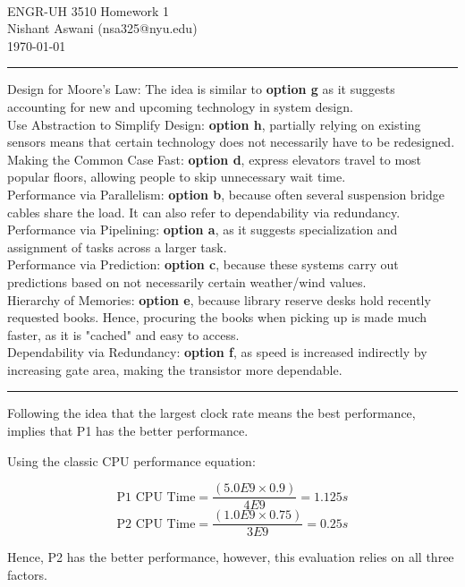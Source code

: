 \documentclass[11pt]{exam}
\makeatletter
\newcommand{\myname}{Nishant Aswani}
\newcommand{\myemail}{nsa325@nyu.edu}
\newcommand{\myhwtype}{Homework}
\newcommand{\myhwnum}{1}
\newcommand{\mycoursenumber}{ENGR-UH 3510}
\newcounter{questionCounter}
\newcounter{partCounter}[questionCounter]
\newenvironment{namedquestion}[1]{%
    \addtocounter{questionCounter}{1}%
    \setcounter{partCounter}{0}%
    \vspace{.2in}%
        \noindent{\bf #1}%
    \vspace{0.3em} \hrule \vspace{.1in}%
}{}
\makeatother
\begin{document}
\

{\newpage}


\thispagestyle{plain}
\begin{center}
  {\Large \mycoursenumber{} \myhwtype{} \myhwnum} \\
  \myname{} (\myemail{}) \\
  \today
\end{center}

\setcounter{questionCounter}{0}

\begin{namedquestion}{Question 1.2}
Design for Moore's Law: The idea is similar to \textbf{option g} as it suggests accounting for new and upcoming technology in system design. \\

Use Abstraction to Simplify Design: \textbf{option h}, partially relying on existing sensors means that certain technology does not necessarily have to be redesigned. \\

Making the Common Case Fast: \textbf{option d}, express elevators travel to most popular floors, allowing people to skip unnecessary wait time. \\

Performance via Parallelism: \textbf{option b}, because often several suspension bridge cables share the load. It can also refer to dependability via redundancy. \\

Performance via Pipelining: \textbf{option a}, as it suggests specialization and assignment of tasks across a larger task. \\

Performance via Prediction: \textbf{option c}, because these systems carry out predictions based on not necessarily certain weather/wind values. \\

Hierarchy of Memories: \textbf{option e}, because library reserve desks hold recently requested books. Hence, procuring the books when picking up is made much faster, as it is "cached" and easy to access.\\

Dependability via Redundancy: \textbf{option f}, as speed is increased indirectly by increasing gate area, making the transistor more dependable. 

\end{namedquestion}

\begin{namedquestion}{Question 1.12.1}
Following the idea that the largest clock rate means the best performance, implies that P1 has the better performance. 

Using the classic CPU performance equation:

 \[\text{P1 CPU Time} = \frac{(5.0E9 \times 0.9)}{4E9} = 1.125s\]
 \[\text{P2 CPU Time} = \frac{(1.0E9 \times 0.75)}{3E9} = 0.25s\]
 
Hence, P2 has the better performance, however, this evaluation relies on all three factors.
\end{namedquestion}
\end{document}
